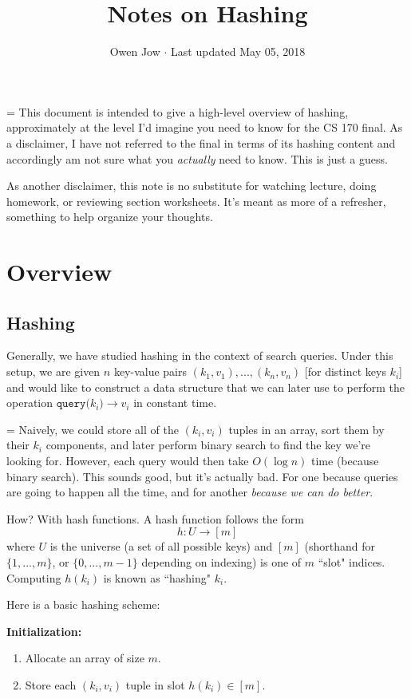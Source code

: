 \documentclass[11pt]{article}
\title{Notes on Hashing}
\author{Owen Jow $\cdot$ Last updated May 05, 2018}
\date{}
\begin{document}
\maketitle

{\parskip=\baselineskip
This document is intended to give a high-level overview of hashing, approximately at the level I'd imagine you need to know for the CS 170 final. As a disclaimer, I have not referred to the final in terms of its hashing content and accordingly am not sure what you \textit{actually} need to know. This is just a guess.

As another disclaimer, this note is no substitute for watching lecture, doing homework, or reviewing section worksheets. It's meant as more of a refresher, something to help organize your thoughts.
}

\section*{Overview}

\subsection*{Hashing}

Generally, we have studied hashing in the context of search queries. Under this setup, we are given $n$ key-value pairs $(k_1, v_1), ..., (k_n, v_n)$ [for distinct keys $k_i$] and would like to construct a data structure that we can later use to perform the operation $\texttt{query(}k_i\texttt{)} \rightarrow v_i$ in constant time.

{\parskip=\baselineskip
Naively, we could store all of the $(k_i, v_i)$ tuples in an array, sort them by their $k_i$ components, and later perform binary search to find the key we're looking for. However, each query would then take $O(\log n)$ time (because binary search). This sounds good, but it's actually bad. For one because queries are going to happen all the time, and for another \textit{because we can do better}.

How? With hash functions. A hash function follows the form
$$h: U \to [m]$$
where $U$ is the universe (a set of all possible keys) and $[m]$ (shorthand for $\{1, ..., m\}$, or $\{0, ..., m - 1\}$ depending on indexing) is one of $m$ ``slot" indices. Computing $h(k_i)$ is known as ``hashing" $k_i$.

Here is a basic hashing scheme:

\textbf{Initialization:}
}
\begin{enumerate}
\item Allocate an array of size $m$.
\item Store each $(k_i, v_i)$ tuple in slot $h(k_i) \in [m]$.
\end{enumerate}
\end{document}
